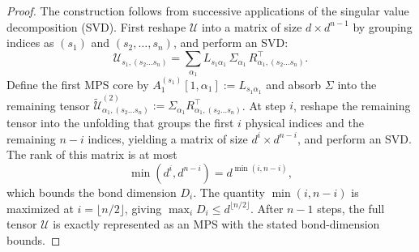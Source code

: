 \documentclass[10pt,a4paper]{amsart}
\begin{document}
\begin{proof}
The construction follows from successive applications of the singular value
decomposition (SVD). First reshape $\mathcal{U}$ into a matrix of size
$d \times d^{n-1}$ by grouping indices as $(s_1)$ and $(s_2,\dots,s_n)$, and
perform an SVD:
\[
\mathcal{U}_{s_1,(s_2 \dots s_n)}
= \sum_{\alpha_1}
L_{s_1 \alpha_1}\, \Sigma_{\alpha_1}\,
R^\top_{\alpha_1,(s_2 \dots s_n)}.
\]
Define the first MPS core by $A_1^{(s_1)}[1,\alpha_1] := L_{s_1\alpha_1}$ and
absorb $\Sigma$ into the remaining tensor
$\widetilde{\mathcal{U}}^{(2)}_{\alpha_1,(s_2 \dots s_n)}
:= \Sigma_{\alpha_1} R^\top_{\alpha_1,(s_2 \dots s_n)}$.
At step $i$, reshape the remaining tensor into the unfolding that groups the
first $i$ physical indices and the remaining $n-i$ indices, yielding a matrix
of size $d^i \times d^{n-i}$, and perform an SVD. The rank of this matrix is at
most
\[
\min(d^i, d^{n-i}) = d^{\min(i,n-i)},
\]
which bounds the bond dimension $D_i$. The quantity $\min(i,n-i)$ is maximized
at $i=\lfloor n/2 \rfloor$, giving $\max_i D_i \le d^{\lfloor n/2 \rfloor}$.
After $n-1$ steps, the full tensor $\mathcal{U}$ is exactly represented as an
MPS with the stated bond-dimension bounds.
\end{proof}
\end{document}
